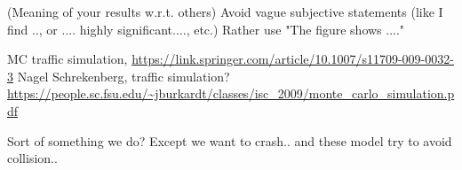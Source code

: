 (Meaning of your results w.r.t. others)
Avoid vague subjective statements (like I find .., or .... highly significant...., etc.)
Rather use "The figure shows ...."


MC traffic simulation, \url{https://link.springer.com/article/10.1007/s11709-009-0032-3}
Nagel Schrekenberg, traffic simulation?
\url{https://people.sc.fsu.edu/~jburkardt/classes/isc_2009/monte_carlo_simulation.pdf}

Sort of something we do? Except we want to crash.. and these model try to avoid collision..